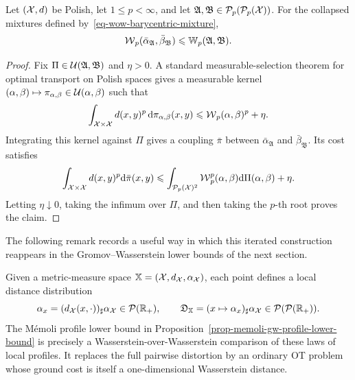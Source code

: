 \begin{prop}\label{prop-wow-collapsed-bound}
	Let $(\mathcal{X},d)$ be Polish, let $1\leq p<\infty$, and let $\mathfrak A,\mathfrak B\in\mathcal{P}_p(\mathcal{P}_p(\mathcal{X}))$. For the collapsed mixtures defined by~\eqref{eq-wow-barycentric-mixture},
	\[
		\operatorname{\mathcal{W}}_p(\bar\alpha_{\mathfrak A},\bar\beta_{\mathfrak B})
		\leqslant
		\mathbb W_p(\mathfrak A,\mathfrak B).
	\]
\end{prop}
\begin{proof}
	Fix $\Pi\in\mathcal{U}(\mathfrak A,\mathfrak B)$ and $\eta>0$. A standard measurable-selection theorem for optimal transport on Polish spaces gives a measurable kernel $(\alpha,\beta)\mapsto\pi_{\alpha,\beta}\in\mathcal{U}(\alpha,\beta)$ such that
	\[
		\int_{\mathcal{X}\times\mathcal{X}}d(x,y)^p\,\mathrm{d}\pi_{\alpha,\beta}(x,y)
		\leqslant \operatorname{\mathcal{W}}_p(\alpha,\beta)^p+\eta.
	\]
	Integrating this kernel against $\Pi$ gives a coupling $\bar\pi$ between $\bar\alpha_{\mathfrak A}$ and $\bar\beta_{\mathfrak B}$. Its cost satisfies
	\[
		\int_{\mathcal{X}\times\mathcal{X}}d(x,y)^p\mathrm{d}\bar\pi(x,y)
		\leqslant
		\int_{\mathcal{P}_p(\mathcal{X})^2}\operatorname{\mathcal{W}}_p^p(\alpha,\beta)\mathrm{d}\Pi(\alpha,\beta)+\eta.
	\]
	Letting $\eta\downarrow0$, taking the infimum over $\Pi$, and then taking the $p$-th root proves the claim.
\end{proof}

The following remark records a useful way in which this iterated construction reappears in the Gromov--Wasserstein lower bounds of the next section.

\begin{rem}
	Given a metric-measure space $\mathbb{X}=(\mathcal{X},d_{\mathcal{X}},\alpha_{\mathcal{X}})$, each point defines a local distance distribution
\[
	\alpha_x=(d_{\mathcal{X}}(x,\cdot))_\sharp\alpha_{\mathcal{X}}\in\mathcal{P}(\mathbb{R}_+),
	\qquad
	\mathfrak D_{\mathbb{X}}=(x\mapsto\alpha_x)_\sharp\alpha_{\mathcal{X}}\in\mathcal{P}(\mathcal{P}(\mathbb{R}_+)).
\]
The M\'emoli profile lower bound in Proposition~\ref{prop-memoli-gw-profile-lower-bound} is precisely a Wasserstein-over-Wasserstein comparison of these laws of local profiles. It replaces the full pairwise distortion by an ordinary OT problem whose ground cost is itself a one-dimensional Wasserstein distance.
%
\end{rem}

